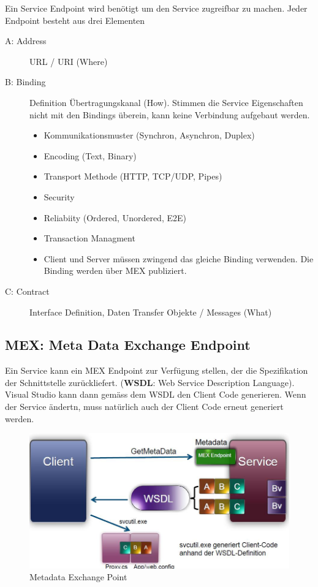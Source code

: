 Ein Service Endpoint wird benötigt um den Service zugreifbar zu machen. Jeder Endpoint besteht aus drei Elementen
\begin{description}
	\item[A: Address] URL / URI (Where)
	\item[B: Binding] Definition Übertragungskanal (How). Stimmen die Service Eigenschaften nicht mit den Bindings überein, kann keine Verbindung aufgebaut werden. 
	\begin{itemize}
		\item Kommunikationsmuster (Synchron, Asynchron, Duplex)
		\item Encoding (Text, Binary)
		\item Transport Methode (HTTP, TCP/UDP, Pipes)
		\item Security
		\item Reliabiity (Ordered, Unordered, E2E)
		\item Transaction Managment
		\item Client und Server müssen zwingend das gleiche Binding verwenden. Die Binding werden über MEX publiziert.
	\end{itemize}
	\item[C: Contract] Interface Definition, Daten Transfer Objekte / Messages (What)
\end{description}

\subsection{MEX: Meta Data Exchange Endpoint}
Ein Service kann ein MEX Endpoint zur Verfügung stellen, der die Spezifikation der Schnittstelle zurückliefert. (\textbf{WSDL}: Web Service Description Language). Visual Studio kann dann gemäss dem WSDL den Client Code generieren. Wenn der Service ändertn, muss natürlich auch der Client Code erneut generiert werden.

\begin{figure}[h!]
\centering
\includegraphics[width=0.7\linewidth]{images/mex}
\caption{Metadata Exchange Point}
\label{fig:mex}
\end{figure}



